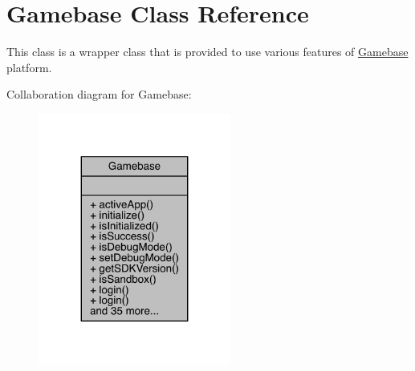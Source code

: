 \hypertarget{classcom_1_1toast_1_1android_1_1gamebase_1_1_gamebase}{}\section{Gamebase Class Reference}
\label{classcom_1_1toast_1_1android_1_1gamebase_1_1_gamebase}


This class is a wrapper class that is provided to use various features of \hyperlink{classcom_1_1toast_1_1android_1_1gamebase_1_1_gamebase}{Gamebase} platform.  




Collaboration diagram for Gamebase\+:\nopagebreak
\begin{figure}[H]
\begin{center}
\leavevmode
\includegraphics[width=179pt]{classcom_1_1toast_1_1android_1_1gamebase_1_1_gamebase__coll__graph}
\end{center}
\end{figure}
